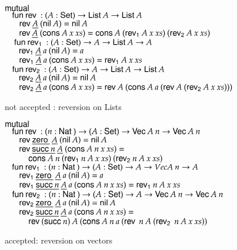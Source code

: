 \begin{figure}[htp]
$\mathsf{mutual}\: $  \\
$ \hspace*{3mm} \mathsf{fun}\: \mathsf{rev}\: : ( A : \mathsf{Set} ) \rightarrow{\mathsf{List}\:A \rightarrow\mathsf{List}\:A} $ \\
$ \spc \spc \rev \inacc{A} \: (\nil A ) = \nil A$\\
$ \spc \spc \rev \inacc{A} \: (\cons A \:x  \: xs) = \cons A \: (\reva A \: x \: xs) \: (\revb A \: x \: xs)$\\
$\ \hspace*{3mm} \mathsf{fun}\: \mathsf{rev_1}\: : ( A  : \mathsf{Set} ) \rightarrow{A  \rightarrow\mathsf{List}\:A \rightarrow A}$\\
$ \spc \spc \reva \inacc{A} \: a \: (\nil A ) = a$ \\
$\spc \spc \reva \inacc{A} \: a \: (\cons A \: x \: xs) = \reva A \: x \: xs$\\
$\hspace*{3mm} \mathsf{fun}\: \mathsf{rev_2}\: : ( A : \mathsf{Set} ) \rightarrow{ A \rightarrow\mathsf{List}\:A \rightarrow\mathsf{List}\:A} $\\
$\spc \spc \revb \inacc{A} \: a \: (\nil A ) = \nil A $\\
$\spc \spc \revb \inacc{A} \: a \: (\cons A\:  x \: xs) = \rev A \: (\cons A \: a \: (\rev A \: (\revb A \: x \: xs)))$
\caption{not accepted : reversion on Lists}  
\label{lrev}
\end{figure}

\begin{figure}[htp] 
$\mathsf{mutual}\: $ \\
$\hspace*{3mm} \mathsf{fun}\: \mathsf{rev}\: : ( n : \mathsf{Nat}\:  ) \rightarrow{( A : \mathsf{Set}) \rightarrow{\mathsf{Vec}\:A \: n \rightarrow\mathsf{Vec}\:A \: n}}$\\
$\spc \spc \rev \inacc{\zero} \: \inacc{A}  \: (\nil A) = \nil A $\\
$\spc \spc \rev \inacc{\suc n} \: \inacc{A} \: (\cons A \: n \: x \: xs) = $\\
$\spcx \cons A \: n \: (\reva n \: A \: x \: xs) \: (\revb n \: A \: x \: xs) $ \\
$\hspace*{3mm} \mathsf{fun}\: \mathsf{rev_1}\: : ( n : \mathsf{Nat}\: ) \rightarrow( A : \mathsf{Set} ) \rightarrow{A \rightarrow Vec A \: n \rightarrow A}$\\
$\spc \spc \reva \inacc{\zero} \: \inacc{A} \: a \: (\nil A) = a $\\
$\spc \spc \reva \inacc{\suc n} \: \inacc{A} \: a \: (\cons A \: n \: x \: xs) = \reva n \: A \: x \: xs $\\
$\hspace*{3mm} \mathsf{fun}\: \mathsf{rev_2}\: : ( n : \mathsf{Nat}\: ) \rightarrow{( A : \mathsf{Set}) \rightarrow{A \rightarrow\mathsf{Vec}\:A \: n \rightarrow\mathsf{Vec}\:A \: n}}$\\
$ \spc \spc \revb \inacc{\zero} \: \inacc{A}  \: a \: (\nil A) = \nil A $\\
$ \spc \spc \revb \inacc{\suc n} \: \inacc{A} \: a \: (\cons A \: n \: x \: xs) = $\\
$ \spcx \rev (\suc n) \: A \: (\cons A \: n \: a \: (\rev \: n \: A \: (\revb \: n \: A \: x \: xs))$
\caption{accepted: reversion on vectors}  
\label{vref}
\end{figure}  

